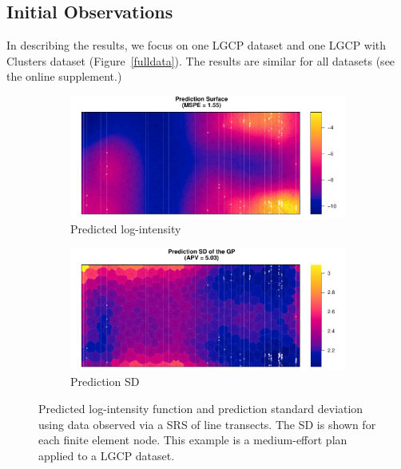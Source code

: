\documentclass[review]{elsarticle}
\begin{document}
\subsection{Initial Observations}

In describing the results, we focus on one LGCP dataset and one LGCP with
Clusters dataset (Figure~\ref{fulldata}). The results are similar for all
datasets (see the online supplement.)

\begin{figure}

\begin{subfigure}{5in}
\includegraphics[width=5in]{../graphics/lambda-SRS000187-LGCP000004.pdf}
\caption{Predicted log-intensity}
\label{lambdasrs000187lgcp}
\end{subfigure}

\begin{subfigure}{5in}
\includegraphics[width=5in]{../graphics/lambdaSD-SRS000187-LGCP000004.pdf}
\caption{Prediction SD}
\label{sdsrs000187lgcp}
\end{subfigure}

\caption{Predicted log-intensity function and prediction standard deviation
using data observed via a SRS of line transects. The SD is shown for each
finite element node. This example is a medium-effort plan applied to a
LGCP dataset.}
\label{srs000187lgcp}
\end{figure}
\end{document}
